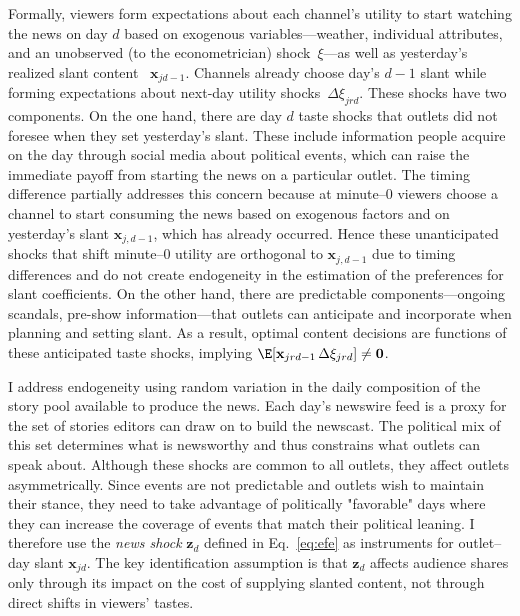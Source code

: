 \documentclass[12pt]{article}
\begin{document}
Formally, viewers form expectations about each channel’s utility to start watching the news on day $d$ based on exogenous variables—weather, individual attributes, and an unobserved (to the econometrician) shock~$\xi$—as well as yesterday’s  realized slant content ~$\bm{x}_{jd-1}$. Channels already choose day's $d-1$ slant while forming expectations about next-day utility shocks~$\Delta\xi_{jrd}$. These shocks have two components.	On the one hand, there are day $d$ taste shocks that outlets did not foresee when they set yesterday's slant.  These include information people acquire on the day through social media about political events, which can raise the immediate payoff from starting the news on a particular outlet. The timing difference partially addresses this concern because at minute–0 viewers choose a channel to start consuming the news based on exogenous factors and on yesterday’s slant $\bm{x}_{j,d-1}$, which has already occurred. Hence these unanticipated shocks that shift minute–0 utility are orthogonal to $\bm{x}_{j,d-1}$ due to timing differences and do not create endogeneity in the estimation of the preferences for slant coefficients. On the other hand, there are predictable components—ongoing scandals, pre-show information—that outlets can anticipate and incorporate when planning and setting slant. As a result,  optimal content decisions are functions of these anticipated taste shocks, implying $\E[\mathbf{x}_{jrd-1}\,\Delta\xi_{jrd}] \neq \mathbf{0}$.
	

	I address endogeneity  using random variation in the daily composition of the story pool available to produce the news. Each day’s newswire feed is a proxy for the set of stories editors can draw on to build the newscast. The political mix of this set determines what is newsworthy and thus constrains what outlets can speak about. Although these shocks are common to all outlets, they affect outlets asymmetrically. Since events are not predictable and outlets wish to maintain their stance, they need to take advantage of politically "favorable" days where they can increase the coverage of events that match their political leaning. I therefore use the \emph{news shock} $\mathbf{z}_d$ defined in Eq.~\eqref{eq:efe} as instruments for outlet–day slant $\mathbf{x}_{jd}$. The key identification assumption is that $\mathbf{z}_d$ affects audience shares only through its impact on the cost of supplying slanted content, not through direct shifts in viewers’ tastes.
	
	
	
\end{document}
